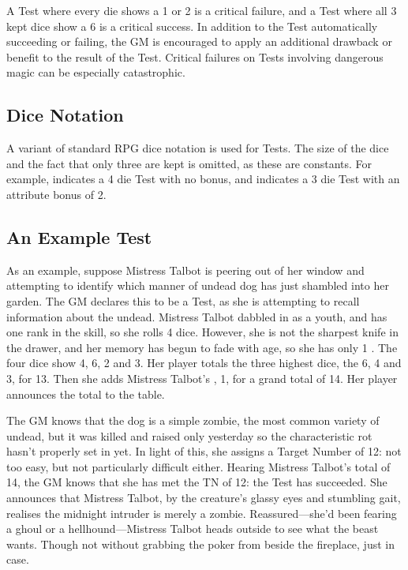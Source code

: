 A Test where every die shows a 1 or 2 is a critical failure, and a Test where all 3 kept dice show a 6 is a critical success.
In addition to the Test automatically succeeding or failing, the GM is encouraged to apply an additional drawback or benefit to the result of the Test.
Critical failures on Tests involving dangerous magic can be especially catastrophic.

\subsection{Dice Notation}

A variant of standard RPG dice notation is used for Tests.
The size of the dice and the fact that only three are kept is omitted, as these are constants.
For example,  indicates a 4 die Test with no bonus, and  indicates a 3 die Test with an attribute bonus of 2.

\subsection{An Example Test}

As an example, suppose Mistress Talbot is peering out of her window and attempting to identify which manner of undead dog has just shambled into her garden.
The GM declares this to be a  Test, as she is attempting to recall information about the undead.
Mistress Talbot dabbled in  as a youth, and has one rank in the skill, so she rolls 4 dice.
However, she is not the sharpest knife in the drawer, and her memory has begun to fade with age, so she has only 1 .
The four dice show 4, 6, 2 and 3.
Her player totals the three highest dice, the 6, 4 and 3, for 13.
Then she adds Mistress Talbot's , 1, for a grand total of 14.
Her player announces the total to the table.

The GM knows that the dog is a simple zombie, the most common variety of undead, but it was killed and raised only yesterday so the characteristic rot hasn't properly set in yet.
In light of this, she assigns a Target Number of 12: not too easy, but not particularly difficult either.
Hearing Mistress Talbot's total of 14, the GM knows that she has met the TN of 12: the Test has succeeded.
She announces that Mistress Talbot, by the creature's glassy eyes and stumbling gait, realises the midnight intruder is merely a zombie.
Reassured---she'd been fearing a ghoul or a hellhound---Mistress Talbot heads outside to see what the beast wants.
Though not without grabbing the poker from beside the fireplace, just in case.

